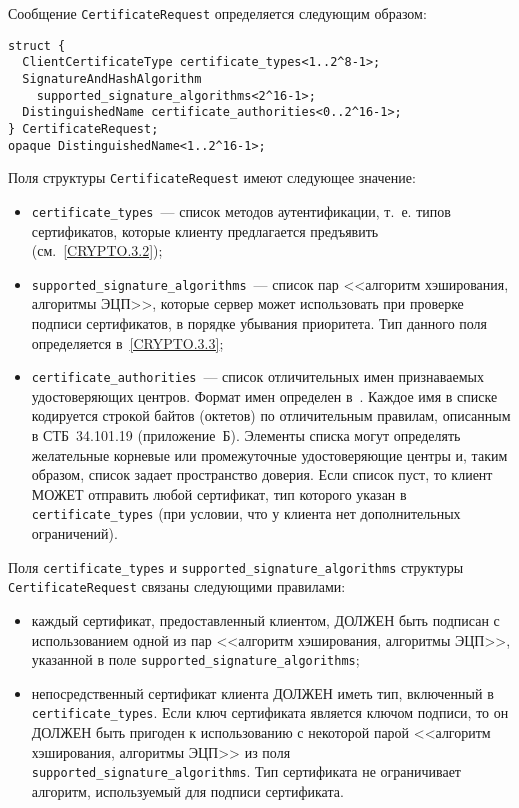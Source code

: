 Сообщение \lstinline{CertificateRequest} определяется следующим образом:
\begin{lstlisting}
struct {
  ClientCertificateType certificate_types<1..2^8-1>;
  SignatureAndHashAlgorithm
    supported_signature_algorithms<2^16-1>;
  DistinguishedName certificate_authorities<0..2^16-1>;
} CertificateRequest;
opaque DistinguishedName<1..2^16-1>;
\end{lstlisting}

Поля структуры \lstinline{CertificateRequest} имеют следующее значение:
\begin{itemize}
\item[--]
\lstinline{certificate_types}~--- 
список методов аутентификации, 
т.~е. типов сертификатов, которые клиенту предлагается предъявить 
(см.~\ref{CRYPTO.3.2}); 

\item[--]
\lstinline{supported_signature_algorithms}~--- список пар <<алгоритм 
хэширования, алгоритмы ЭЦП>>, которые сервер может использовать при проверке 
подписи сертификатов, в порядке убывания приоритета. Тип данного поля 
определяется в~\ref{CRYPTO.3.3};  

\item[--]
\lstinline{certificate_authorities}~--- список отличительных имен 
признаваемых удостоверяющих центров. Формат имен определен в~\cite{X501}. 
Каждое имя в списке кодируется строкой байтов (октетов) по отличительным 
правилам, описанным в СТБ~34.101.19 (приложение~Б). 
Элементы списка могут определять желательные корневые или промежуточные 
удостоверяющие центры и, таким образом, список задает пространство 
доверия. Если список пуст, то клиент МОЖЕТ отправить любой сертификат, тип 
которого указан в \lstinline{certificate_types} (при условии, что у 
клиента нет дополнительных ограничений). 
\end{itemize}

Поля \lstinline{certificate_types} и 
\lstinline{supported_signature_algorithms} структуры 
\lstinline{CertificateRequest} связаны следующими правилами: 
\begin{itemize}
\item[--] 
каждый сертификат, предоставленный клиентом, ДОЛЖЕН быть подписан 
с использованием одной из пар <<алгоритм хэширования, алгоритмы ЭЦП>>, 
указанной в поле \lstinline{supported_signature_algorithms}; 

\item[--]
непосредственный сертификат клиента ДОЛЖЕН иметь тип, включенный 
в \lstinline{certificate_types}. Если ключ сертификата является ключом 
подписи, то он ДОЛЖЕН быть пригоден к использованию с некоторой парой 
<<алгоритм хэширования, алгоритмы ЭЦП>> из поля 
\lstinline{supported_signature_algorithms}. Тип сертификата не 
ограничивает алгоритм, используемый для подписи сертификата. 
\end{itemize}

